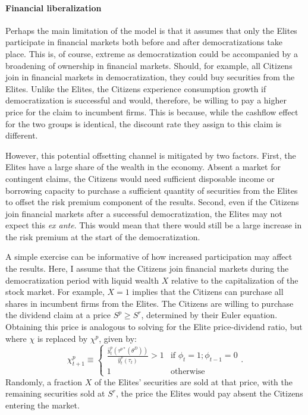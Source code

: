 \documentclass[12pt]{article}
\numberwithin{equation}{section}
\begin{document}
\paragraph{Financial liberalization}
\label{par:finanace_lib_beg}
Perhaps the main limitation of the model is that it assumes that only the Elites participate in financial markets both before and after democratizations take place. This is, of course, extreme as democratization could be accompanied by a broadening of ownership in financial markets. Should, for example, all Citizens join in financial markets in democratization, they could buy securities from the Elites. Unlike the Elites, the Citizens experience consumption growth if democratization is successful and would, therefore, be willing to pay a higher price for the claim to incumbent firms. This is because, while the cashflow effect for the two groups is identical, the discount rate they assign to this claim is different.

However, this potential offsetting channel is mitigated by two factors. First, the Elites have a large share of the wealth in the economy. Absent a market for contingent claims, the Citizens would need sufficient disposable income or borrowing capacity to purchase a sufficient quantity of securities from the Elites to offset the risk premium component of the results. Second, even if the Citizens join financial markets after a successful democratization, the Elites may not expect this \textit{ex ante}. This would mean that there would still be a large increase in the risk premium at the start of the democratization.

A simple exercise can be informative of how increased participation may affect the results. Here, I assume that the Citizens join financial markets during the democratization period with liquid wealth $X$ relative to the capitalization of the stock market. For example, $X=1$ implies that the Citizens can purchase all shares in incumbent firms from the Elites. The Citizens are willing to purchase the dividend claim at a price $S^p \geq S^r$, determined by their Euler equation. Obtaining this price is analogous to solving for the Elite price-dividend ratio, but where $\chi$ is replaced by $\chi^p$, given by:
\begin{equation}\label{eq:citizen_disaster}
\chi^p_{t+1} \equiv \begin{cases} 
\frac{\hat{y}_{t}^{p}(\tau^{p*}(\theta^{D}))}{\hat{y}_{t}^{p}(\tau_{t})} > 1 & \textrm{if }\phi_{t}=1;\phi_{t-1}=0 \\
1 & \textrm{otherwise}
\end{cases}.
\end{equation}
Randomly, a fraction $X$ of the Elites' securities are sold at that price, with the remaining securities sold at $S^r$, the price the Elites would pay absent the Citizens entering the market.
\end{document}
